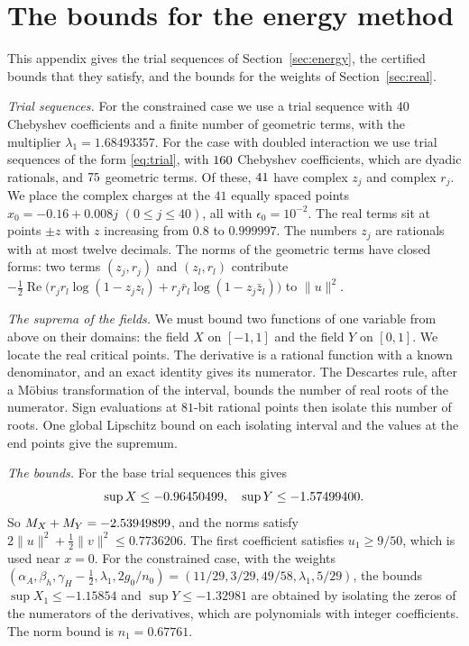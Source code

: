 \section{The bounds for the energy method}\label{app:field}

This appendix gives the trial sequences of Section~\ref{sec:energy}, the certified bounds that they satisfy, and
the bounds for the weights of Section~\ref{sec:real}.

\emph{Trial sequences.} For the constrained case we use a trial sequence with $40$ Chebyshev coefficients and a
finite number of geometric terms, with the multiplier $\lambda_1=1.68493357$. For the case with doubled
interaction we use trial sequences of the form \eqref{eq:trial}, with $160$ Chebyshev coefficients, which are
dyadic rationals, and $75$ geometric terms. Of these, $41$ have complex $z_j$ and complex $r_j$. We
place the complex charges at the $41$ equally spaced points $x_0=-0.16+0.008j$ $(0\le j\le40)$, all with
$\epsilon_0=10^{-2}$. The real terms sit at points $\pm z$ with $z$ increasing from $0.8$ to $0.999997$. The
numbers $z_j$ are rationals with at most twelve decimals. The norms of the geometric terms have closed forms:
two terms $(z_j,r_j)$ and $(z_l,r_l)$ contribute
$-\frac12\operatorname{Re}\bigl(r_jr_l\log(1-z_jz_l)+r_j\bar r_l\log(1-z_j\bar z_l)\bigr)$ to $\|u\|^2$.

\emph{The suprema of the fields.} We must bound two functions of one variable from above on their domains: the
field $X$ on $[-1,1]$ and the field $Y$ on $[0,1]$. We locate the real
critical points. The derivative is a rational function with a known denominator, and an exact identity gives its
numerator. The Descartes rule, after a M\"obius transformation of the interval, bounds the number of real roots
of the numerator. Sign evaluations at $81$-bit rational points then isolate this number of roots. One global Lipschitz
bound on each isolating interval and the values at the end points give the supremum.

\emph{The bounds.} For the base trial sequences this gives
\[
 \sup X\le-0.96450499,\quad \sup Y\le-1.57499400 .
\]
So $M_X+M_Y=-2.53949899$, and the norms satisfy $2\|u\|^2+\frac12\|v\|^2\le0.7736206$. The first coefficient satisfies
$u_1\ge9/50$, which is used near $x=0$. For the constrained case, with the weights
$(\alpha_A,\beta_h,\gamma_H-\frac12,\lambda_1,2g_0/n_0)=(11/29,3/29,49/58,\lambda_1,5/29)$, the bounds
$\sup X_1\le-1.15854$ and $\sup Y\le-1.32981$ are obtained by isolating the zeros of the numerators of the
derivatives, which are polynomials with integer coefficients. The norm bound is $n_1=0.67761$.

